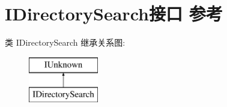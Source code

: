 \hypertarget{interface_i_directory_search}{}\section{I\+Directory\+Search接口 参考}
\label{interface_i_directory_search}
类 I\+Directory\+Search 继承关系图\+:\begin{figure}[H]
\begin{center}
\leavevmode
\includegraphics[height=2.000000cm]{interface_i_directory_search}
\end{center}
\end{figure}
